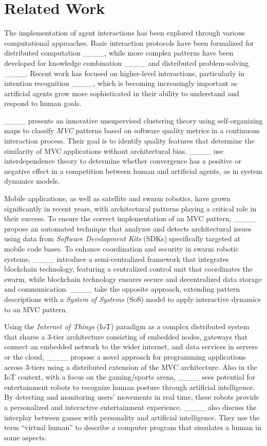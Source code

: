 \section{Related Work}
\label{sec:relwork}
The implementation of agent interactions has been explored through various computational approaches. Basic interaction protocols have been formalized for distributed computation ____, while more complex patterns have been developed for knowledge combination ____ and distributed problem-solving ____. Recent work has focused on higher-level interactions, particularly in intention recognition ____, which is becoming increasingly important as artificial agents grow more sophisticated in their ability to understand and respond to human goals.

____ presents an innovative unsupervised clustering theory using self-or\-ga\-niz\-ing maps to classify \textit{MVC} patterns based on software quality metrics in a continuous interaction process. Their goal is to identify quality features that determine the similarity of MVC applications without architectural bias.
____ use interdependence theory to determine whether convergence has a positive or negative effect in a competition between human and artificial agents, as in system dynamics models. 

Mobile applications, as well as satellite and swarm robotics, have grown significantly in recent years, with architectural patterns playing a critical role in their success. To ensure the correct implementation of an MVC pattern, ____ propose an automated technique that analyzes and detects architectural issues using data from {\em Software Development Kits} (SDKs) specifically targeted at mobile code bases.
To enhance coordination and security in swarm robotic systems, ____ introduce a semi-centralized framework that integrates blockchain technology, featuring a centralized control unit that coordinates the swarm, while blockchain technology ensures secure and decentralized data storage and communication.
%
____ take the opposite approach, extending pattern descriptions with a {\em System of Systems} (SoS) model to apply interactive dynamics to an MVC pattern.

Using the {\em Internet of Things} (IoT) paradigm as a complex distributed system that shares a 3-tier architecture consisting of embedded nodes, gateways that connect an embedded network to the wider internet, and data services in servers or the cloud, ____ propose a novel approach for programming applications across 3-tiers using a distributed extension of the MVC architecture. 
Also in the IoT context, with a focus on the gaming/sports arena, ____ sees 
%
%
potential for entertainment robots to recognize human posture through artificial intelligence. 
By detecting and monitoring users' movements in real time, these robots provide a personalized and interactive entertainment experience.
____ also discuss the interplay between games with personality and artificial intelligence. They use the term ``virtual human'' to describe a computer program that simulates a human in some aspects.


